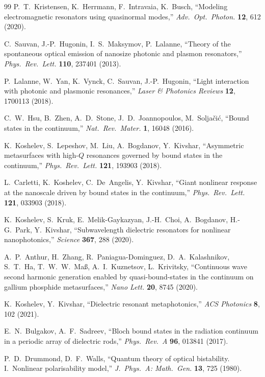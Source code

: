 \documentclass[11pt,a4paper]{article}
\begin{document}
\begin{thebibliography}{99}
P.~T.~Kristensen, K.~Herrmann, F.~Intravaia, K.~Busch,
``Modeling electromagnetic resonators using quasinormal modes,''
\emph{Adv.\ Opt.\ Photon.} \textbf{12}, 612 (2020).

C.~Sauvan, J.-P.~Hugonin, I.~S.~Maksymov, P.~Lalanne,
``Theory of the spontaneous optical emission of nanosize photonic and plasmon resonators,''
\emph{Phys.\ Rev.\ Lett.} \textbf{110}, 237401 (2013).

P.~Lalanne, W.~Yan, K.~Vynck, C.~Sauvan, J.-P.~Hugonin,
``Light interaction with photonic and plasmonic resonances,''
\emph{Laser \& Photonics Reviews} \textbf{12}, 1700113 (2018).

C.~W.~Hsu, B.~Zhen, A.~D.~Stone, J.~D.~Joannopoulos, M.~Solja\v{c}i\'c,
``Bound states in the continuum,''
\emph{Nat.\ Rev.\ Mater.} \textbf{1}, 16048 (2016).

K.~Koshelev, S.~Lepeshov, M.~Liu, A.~Bogdanov, Y.~Kivshar,
``Asymmetric metasurfaces with high-$Q$ resonances governed by bound states in the continuum,''
\emph{Phys.\ Rev.\ Lett.} \textbf{121}, 193903 (2018).

L.~Carletti, K.~Koshelev, C.~De~Angelis, Y.~Kivshar,
``Giant nonlinear response at the nanoscale driven by bound states in the continuum,''
\emph{Phys.\ Rev.\ Lett.} \textbf{121}, 033903 (2018).

K.~Koshelev, S.~Kruk, E.~Melik-Gaykazyan, J.-H.~Choi, A.~Bogdanov, H.-G.~Park, Y.~Kivshar,
``Subwavelength dielectric resonators for nonlinear nanophotonics,''
\emph{Science} \textbf{367}, 288 (2020).

A.~P.~Anthur, H.~Zhang, R.~Paniagua-Dominguez, D.~A.~Kalashnikov, S.~T.~Ha,
T.~W.~W.~Ma{\ss}, A.~I.~Kuznetsov, L.~Krivitsky,
``Continuous wave second harmonic generation enabled by quasi-bound-states in the continuum on gallium phosphide metasurfaces,''
\emph{Nano Lett.} \textbf{20}, 8745 (2020).

K.~Koshelev, Y.~Kivshar,
``Dielectric resonant metaphotonics,''
\emph{ACS Photonics} \textbf{8}, 102 (2021).

E.~N.~Bulgakov, A.~F.~Sadreev,
``Bloch bound states in the radiation continuum in a periodic array of dielectric rods,''
\emph{Phys.\ Rev.\ A} \textbf{96}, 013841 (2017).

P.~D.~Drummond, D.~F.~Walls,
``Quantum theory of optical bistability. I.\ Nonlinear polarisability model,''
\emph{J.\ Phys.\ A: Math.\ Gen.} \textbf{13}, 725 (1980).


\end{thebibliography}
\end{document}
